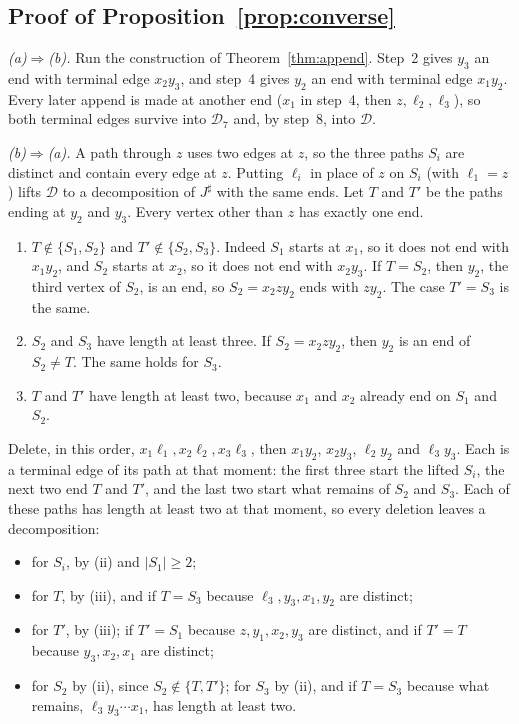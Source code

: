 \documentclass[11pt]{amsart}
\theoremstyle{definition}
\newcommand{\cD}{\mathcal D}
\newcommand{\sh}{{\sharp}}
\begin{document}
\subsection*{Proof of Proposition~\ref{prop:converse}}
\emph{(a)$\Rightarrow$(b).} Run the construction of Theorem~\ref{thm:append}. Step~2 gives $y_3$
an end with terminal edge $x_2y_3$, and step~4 gives $y_2$ an end with terminal edge $x_1y_2$.
Every later append is made at another end ($x_1$ in step~4, then $z,\ell_2,\ell_3$), so both
terminal edges survive into $\cD_7$ and, by step~8, into $\cD$.

\emph{(b)$\Rightarrow$(a).} A path through $z$ uses two edges at $z$, so the three paths $S_i$
are distinct and contain every edge at $z$. Putting $\ell_i$ in place of $z$ on $S_i$ (with
$\ell_1=z$) lifts $\cD$ to a decomposition of $J^\sh$ with the same ends. Let $T$ and $T'$ be
the paths ending at $y_2$ and $y_3$. Every vertex other than $z$ has exactly one end.
\begin{enumerate}[label=(\roman*)]
\item $T\notin\{S_1,S_2\}$ and $T'\notin\{S_2,S_3\}$. Indeed $S_1$ starts at $x_1$, so it does
not end with $x_1y_2$, and $S_2$ starts at $x_2$, so it does not end with $x_2y_3$. If $T=S_2$, then
$y_2$, the third vertex of $S_2$, is an end, so $S_2=x_2zy_2$ ends with $zy_2$. The case $T'=S_3$
is the same.
\item $S_2$ and $S_3$ have length at least three. If $S_2=x_2zy_2$, then $y_2$ is an end of
$S_2\ne T$. The same holds for $S_3$.
\item $T$ and $T'$ have length at least two, because $x_1$ and $x_2$ already end on $S_1$ and $S_2$.
\end{enumerate}
Delete, in this order, $x_1\ell_1,x_2\ell_2,x_3\ell_3$, then $x_1y_2$, $x_2y_3$, $\ell_2y_2$ and
$\ell_3y_3$. Each is a terminal edge of its path at that moment: the first three start the lifted
$S_i$, the next two end $T$ and $T'$, and the last two start what remains of $S_2$ and $S_3$. Each
of these paths has length at least two at that moment, so every deletion leaves a decomposition:
\begin{itemize}
\item for $S_i$, by (ii) and $|S_1|\ge2$;
\item for $T$, by (iii), and if $T=S_3$ because $\ell_3,y_3,x_1,y_2$ are distinct;
\item for $T'$, by (iii); if $T'=S_1$ because $z,y_1,x_2,y_3$ are distinct, and if $T'=T$
because $y_3,x_2,x_1$ are distinct;
\item for $S_2$ by (ii), since $S_2\notin\{T,T'\}$; for $S_3$ by (ii), and if $T=S_3$ because
what remains, $\ell_3y_3\cdots x_1$, has length at least two.
\end{itemize}
\end{document}
